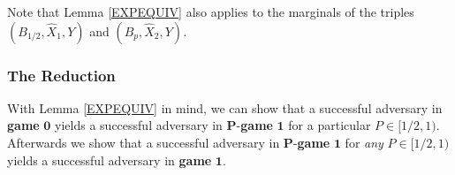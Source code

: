 \documentclass[10pt]{extarticle}
\begin{document}
\noindent Note that Lemma \ref{EXPEQUIV} also applies to the marginals of the triples $(B_{1/2},\widehat{X}_1,Y)$ and $(B_{p},\widehat{X}_2,Y)$.

\subsubsection{The Reduction}

With Lemma \ref{EXPEQUIV} in mind, we can show that a successful adversary in \textbf{game} $\boldsymbol 0$ yields a successful adversary in $\boldsymbol P$-\textbf{game} $\boldsymbol 1$ for a particular $P\in[1/2,1)$. Afterwards we show that a successful adversary in $\boldsymbol P$-\textbf{game} $\boldsymbol 1$ for \textit{any} $P\in[1/2,1)$ yields a successful adversary in \textbf{game} $\boldsymbol 1$.
\end{document}
